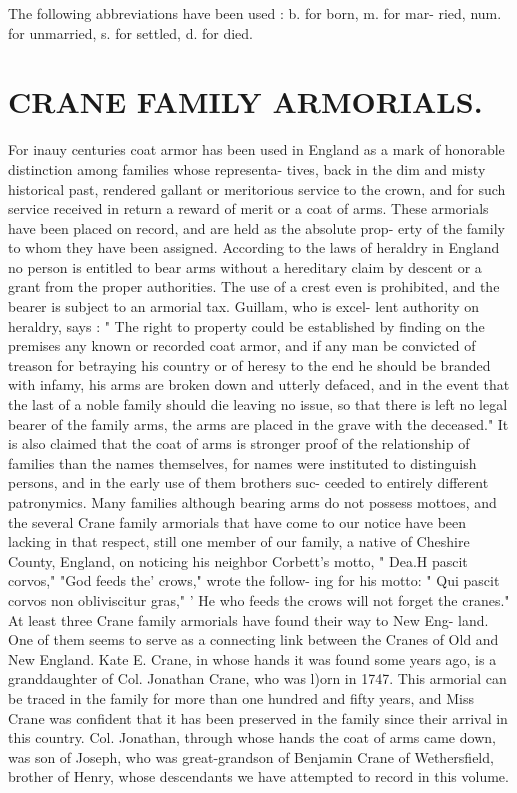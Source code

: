 \documentclass[oneside]{book}
\begin{document}
The following abbreviations have been used : b. for born, m. for mar- 
ried, num. for unmarried, s. for settled, d. for died. 


\chapter{CRANE FAMILY ARMORIALS.}


For inauy centuries coat armor has been used in England as a 
mark of honorable distinction among families whose representa- 
tives, back in the dim and misty historical past, rendered gallant 
or meritorious service to the crown, and for such service received 
in return a reward of merit or a coat of arms. These armorials 
have been placed on record, and are held as the absolute prop- 
erty of the family to whom they have been assigned. According 
to the laws of heraldry in England no person is entitled to bear 
arms without a hereditary claim by descent or a grant from the 
proper authorities. The use of a crest even is prohibited, and 
the bearer is subject to an armorial tax. Guillam, who is excel- 
lent authority on heraldry, says : " The right to property could be 
established by finding on the premises any known or recorded 
coat armor, and if any man be convicted of treason for betraying 
his country or of heresy to the end he should be branded with 
infamy, his arms are broken down and utterly defaced, and in 
the event that the last of a noble family should die leaving no 
issue, so that there is left no legal bearer of the family arms, the 
arms are placed in the grave with the deceased." It is also 
claimed that the coat of arms is stronger proof of the relationship 
of families than the names themselves, for names were instituted 
to distinguish persons, and in the early use of them brothers suc- 
ceeded to entirely different patronymics. Many families although 
bearing arms do not possess mottoes, and the several Crane family 
armorials that have come to our notice have been lacking in that 
respect, still one member of our family, a native of Cheshire 
County, England, on noticing his neighbor Corbett's motto, 
" Dea.H pascit corvos," "God feeds the' crows," wrote the follow- 
ing for his motto: " Qui pascit corvos non obliviscitur gras," 
' He who feeds the crows will not forget the cranes." At least 
three Crane family armorials have found their way to New Eng- 
land. One of them seems to serve as a connecting link between 
the Cranes of Old and New England. Kate E. Crane, in whose 
hands it was found some years ago, is a granddaughter of Col. 
Jonathan Crane, who was l)orn in 1747. This armorial can be 
traced in the family for more than one hundred and fifty years, 
and Miss Crane was confident that it has been preserved in the 
family since their arrival in this country. Col. Jonathan, through 
whose hands the coat of arms came down, was son of Joseph, 
who was great-grandson of Benjamin Crane of Wethersfield, 
brother of Henry, whose descendants we have attempted to 
record in this volume. 
\end{document}
